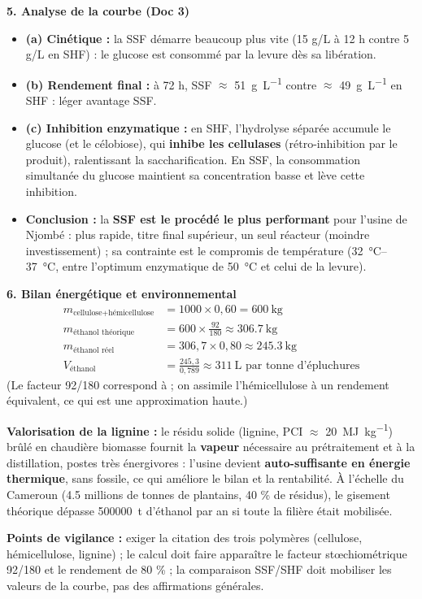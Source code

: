 \documentclass[11pt]{article}
\begin{document}
\begin{corrige}
\textbf{5. Analyse de la courbe (Doc 3)}
\begin{itemize}
    \item \textbf{(a) Cinétique :} la SSF démarre beaucoup plus vite (15 g/L à 12 h contre 5 g/L en SHF) : le glucose est consommé par la levure dès sa libération.
    \item \textbf{(b) Rendement final :} à 72 h, SSF $\approx$ \SI{51}{\gram\per\liter} contre $\approx$ \SI{49}{\gram\per\liter} en SHF : léger avantage SSF.
    \item \textbf{(c) Inhibition enzymatique :} en SHF, l'hydrolyse séparée accumule le glucose (et le célobiose), qui \textbf{inhibe les cellulases} (rétro-inhibition par le produit), ralentissant la saccharification. En SSF, la consommation simultanée du glucose maintient sa concentration basse et lève cette inhibition.
    \item \textbf{Conclusion :} la \textbf{SSF est le procédé le plus performant} pour l'usine de Njombé : plus rapide, titre final supérieur, un seul réacteur (moindre investissement) ; sa contrainte est le compromis de température (\SI{32}{\celsius}--\SI{37}{\celsius}, entre l'optimum enzymatique de \SI{50}{\celsius} et celui de la levure).
\end{itemize}

\textbf{6. Bilan énergétique et environnemental}
\begin{align*}
m_{\text{cellulose+hémicellulose}} &= 1000 \times 0{,}60 = \SI{600}{\kilogram} \\
m_{\text{éthanol théorique}} &= 600 \times \frac{92}{180} \approx \SI{306,7}{\kilogram} \\
m_{\text{éthanol réel}} &= 306{,}7 \times 0{,}80 \approx \SI{245,3}{\kilogram} \\
V_{\text{éthanol}} &= \frac{245{,}3}{0{,}789} \approx \boxed{\SI{311}{\liter} \text{ par tonne d'épluchures}}
\end{align*}
(Le facteur 92/180 correspond à  ; on assimile l'hémicellulose à un rendement équivalent, ce qui est une approximation haute.)

\textbf{Valorisation de la lignine :} le résidu solide (lignine, PCI $\approx$ \SI{20}{\mega\joule\per\kilogram}) brûlé en chaudière biomasse fournit la \textbf{vapeur} nécessaire au prétraitement et à la distillation, postes très énergivores : l'usine devient \textbf{auto-suffisante en énergie thermique}, sans fossile, ce qui améliore le bilan  et la rentabilité. À l'échelle du Cameroun (\num{4,5} millions de tonnes de plantains, 40 \% de résidus), le gisement théorique dépasse \SI{500000}{\tonne} d'éthanol par an si toute la filière était mobilisée.

\textbf{Points de vigilance :} exiger la citation des trois polymères (cellulose, hémicellulose, lignine) ; le calcul doit faire apparaître le facteur stœchiométrique 92/180 et le rendement de 80 \% ; la comparaison SSF/SHF doit mobiliser les valeurs de la courbe, pas des affirmations générales.
\end{corrige}
\end{document}
